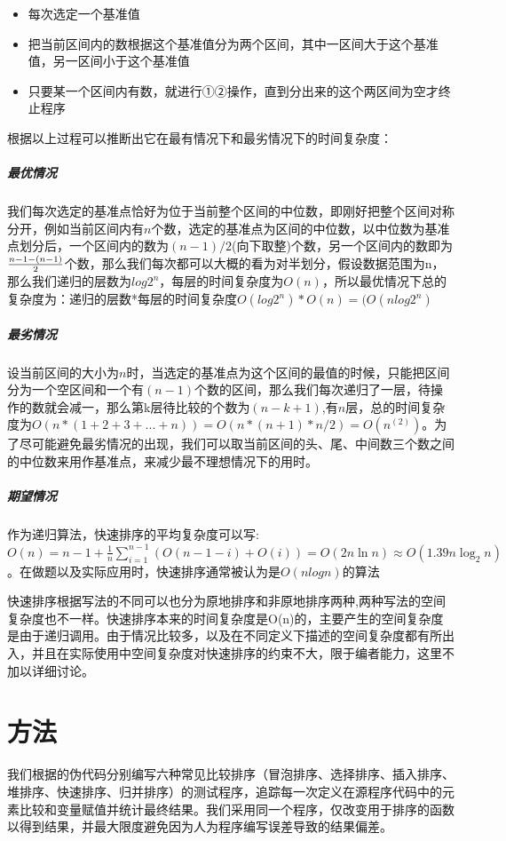 \documentclass[UTF8]{ctexart}
\begin{document}
\begin{itemize}
	\item 每次选定一个基准值
	\item 把当前区间内的数根据这个基准值分为两个区间，其中一区间大于这个基准值，另一区间小于这个基准值
	\item 只要某一个区间内有数，就进行①②操作，直到分出来的这个两区间为空才终止程序
\end{itemize}

根据以上过程可以推断出它在最有情况下和最劣情况下的时间复杂度：
\subparagraph{最优情况}
我们每次选定的基准点恰好为位于当前整个区间的中位数，即刚好把整个区间对称分开，例如当前区间内有$n$个数，选定的基准点为区间的中位数，以中位数为基准点划分后，一个区间内的数为$(n-1)/2$(向下取整)个数，另一个区间内的数即为$n - 1 - (n-1) \over 2$个数，那么我们每次都可以大概的看为对半划分，假设数据范围为n，那么我们递归的层数为$log2^n$，每层的时间复杂度为$O(n)$，所以最优情况下总的复杂度为：递归的层数*每层的时间复杂度$O(log2^n)*O(n)=(O(nlog2^n)$

\subparagraph{最劣情况}
设当前区间的大小为$n$时，当选定的基准点为这个区间的最值的时候，只能把区间分为一个空区间和一个有$(n-1)$个数的区间，那么我们每次递归了一层，待操作的数就会减一，那么第k层待比较的个数为$(n-k+1)$,有$n$层，总的时间复杂度为$O(n*(1+2+3+...+n))=O(n*(n+1)*n/2)=O(n^(2))$。为了尽可能避免最劣情况的出现，我们可以取当前区间的头、尾、中间数三个数之间的中位数来用作基准点，来减少最不理想情况下的用时。

\subparagraph{期望情况}
作为递归算法，快速排序的平均复杂度可以写:$O(n)=n-1+\frac{1}{n}\sum_{i=1}^{n-1}(O(n-1-i)+O(i))=O(2n\ln{n})≈O(1.39 n \log_2 n)$。在做题以及实际应用时，快速排序通常被认为是$O(nlog{n})$的算法

快速排序根据写法的不同可以也分为原地排序和非原地排序两种,两种写法的空间复杂度也不一样。快速排序本来的时间复杂度是O(n)的，主要产生的空间复杂度是由于递归调用。由于情况比较多，以及在不同定义下描述的空间复杂度都有所出入，并且在实际使用中空间复杂度对快速排序的约束不大，限于编者能力，这里不加以详细讨论。

\section{方法}
我们根据\citeauthor{cormen1990introduction}的伪代码分别编写六种常见比较排序（冒泡排序、选择排序、插入排序、堆排序、快速排序、归并排序）的测试程序，追踪每一次定义在源程序代码中的元素比较和变量赋值并统计最终结果。我们采用同一个程序，仅改变用于排序的函数以得到结果，并最大限度避免因为人为程序编写误差导致的结果偏差。
\end{document}
